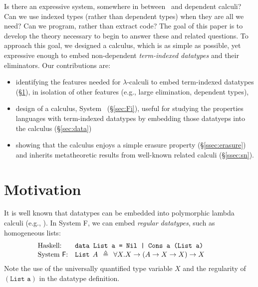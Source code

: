 Is there an expressive system, somewhere in between \Fw\ and dependent calculi?
Can we use indexed types (rather than dependent types) when they are all
we need? Can we program, rather than extract code?
The goal of this paper is to develop the theory necessary to begin to answer
these and related questions. To approach this goal, we designed a calculus,
which is as simple as possible, yet expressive enough to embed non-dependent
\emph{term-indexed datatypes} and their eliminators.
Our contributions are:\vspace*{-3pt}
\begin{itemize}
\item identifying the features needed for $\lambda$-calculi 
    to embed term-indexed datatypes (\S\ref{sec:motiv}),
    in isolation of other features
    (e.g., large elimination, dependent types),
    \vspace*{-3pt}
\item design of a calculus, System \Fi\ (\S\ref{sec:Fi}),
    useful for studying the properties languages with term-indexed datatypes
    by embedding those datatyeps into the calculus (\S\ref{sec:data})
\item showing that the calculus enjoys a simple erasure property
    (\S\ref{ssec:erasure}) and inherits metatheoretic results
    from well-known related calculi (\S\ref{ssec:sn}).
\end{itemize}\vspace*{-3pt}


\section{Motivation}
\label{sec:motiv}
It is well known that datatypes can be embedded into polymorphic lambda calculi
(e.g., \cite{AbeMatUus03}).  In System \textsf{F}, we can embed \emph{regular datatypes},
such as homogeneous lists:
\[\!\!\!\!\!\!\!\!\!
\begin{array}{ll}
\text{Haskell:} & \texttt{data List a = Nil | Cons a (List a)} \\
\text{System \textsf{F}:} & \texttt{{List}}\:\: A\:\:\triangleq\:\:\forall X.X\to(A\to X\to X)\to X ~~\;
\end{array}
\]
Note the use of the universally quantified type variable $X$
and the regularity of $(\texttt{List a})$ in the datatype definition.

